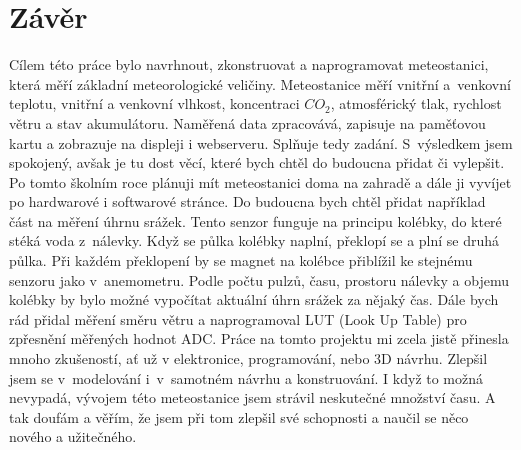 \chapter{Závěr}
    Cílem této práce bylo navrhnout, zkonstruovat a naprogramovat meteostanici, která měří základní meteorologické veličiny. Meteostanice měří vnitřní a~venkovní teplotu, vnitřní a venkovní vlhkost, koncentraci $CO_2$, atmosférický tlak, rychlost větru a stav akumulátoru. Naměřená data zpracovává, zapisuje na paměťovou kartu a zobrazuje na displeji i webserveru. Splňuje tedy zadání. S~výsledkem jsem spokojený, avšak je tu dost věcí, které bych chtěl do budoucna přidat či vylepšit. Po tomto školním roce plánuji mít meteostanici doma na zahradě a dále ji vyvíjet po hardwarové i softwarové stránce. Do budoucna bych chtěl přidat například část na měření úhrnu srážek. Tento senzor funguje na principu kolébky, do které stéká voda z~nálevky. Když se půlka kolébky naplní, překlopí se a plní se druhá půlka. Při každém překlopení by se magnet na kolébce přiblížil ke stejnému senzoru jako v~anemometru. Podle počtu pulzů, času, prostoru nálevky a objemu kolébky by bylo možné vypočítat aktuální úhrn srážek za nějaký čas. Dále bych rád přidal měření směru větru a naprogramoval LUT (Look Up Table) pro zpřesnění měřených hodnot ADC. Práce na tomto projektu mi zcela jistě přinesla mnoho zkušeností, ať už v elektronice, programování, nebo 3D návrhu. Zlepšil jsem se v~modelování i~v~samotném návrhu a konstruování. I když to možná nevypadá, vývojem této meteostanice jsem strávil neskutečné množství času. A tak doufám a věřím, že jsem při tom zlepšil své schopnosti a naučil se něco nového a užitečného.